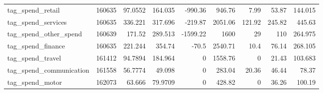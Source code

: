 \begin{tabular}{lrrrrrrrr}
 tag\_spend\_retail        &  160635 &   97.0552     &  164.035    &   -990.36    &    946.76    &    7.99      &   53.87       &  144.015    \\
 tag\_spend\_services      &  160635 &  336.221      &  317.696    &   -219.87    &   2051.06    &  121.92      &  245.82       &  445.63     \\
 tag\_spend\_other\_spend   &  160639 &  171.52       &  289.513    &  -1599.22    &   1600       &   29         &  110          &  264.975    \\
 tag\_spend\_finance       &  160635 &  221.244      &  354.74     &    -70.5     &   2540.71    &   10.4       &   76.14       &  268.105    \\
 tag\_spend\_travel        &  161412 &   94.7894     &  184.964    &      0       &   1558.76    &    0         &   21.43       &  103.683    \\
 tag\_spend\_communication &  161558 &   56.7774     &   49.098    &      0       &    283.04    &   20.36      &   46.44       &   78.37     \\
 tag\_spend\_motor         &  162073 &   63.666      &   79.9709   &      0       &    428.82    &    0         &   36.26       &  100.19     \\
\bottomrule
\end{tabular}
